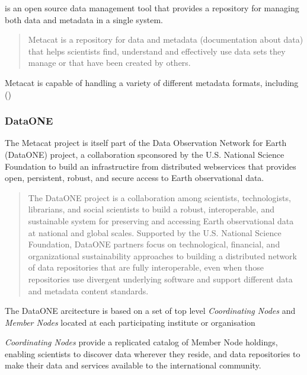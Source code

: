 \documentclass{article}
\begin{document}
\cite{metacat} is an open source data management tool that provides a
repository for managing both data and metadata in a single system.

\begin{quote}
Metacat is a repository for data and metadata (documentation about data) that
helps scientists find, understand and effectively use data sets they manage or
that have been created by others.
\end{quote}

Metacat is capable of handling a variety of different metadata formats,
including
 (\cite{eml})



\subsubsection{DataONE}

The Metacat project is itself part of the Data Observation Network for Earth (DataONE)
project, a collaboration spconsored by the U.S. National Science Foundation to build
an infrastructire from distributed webservices that provides open, persistent, robust,
and secure access to Earth observational data.
 
\begin{quote}
The DataONE project is a collaboration among scientists, technologists,
librarians, and social scientists to build a robust, interoperable, and
sustainable system for preserving and accessing Earth observational data at
national and global scales. Supported by the U.S. National Science Foundation,
DataONE partners focus on technological, financial, and organizational
sustainability approaches to building a distributed network of data repositories
that are fully interoperable, even when those repositories use divergent
underlying software and support different data and metadata content standards.
\end{quote}

The DataONE arcitecture is based on a set of top level 
\textit{Coordinating Nodes}
and
\textit{Member Nodes}
located at each participating institute or organisation

\textit{Coordinating Nodes}
provide a replicated catalog of Member Node holdings, enabling
scientists to discover data wherever they reside,
and data repositories to make their data and services available
to the international community.
\end{document}
